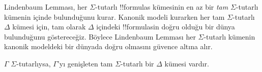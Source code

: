 \documentclass[../../../include/open-logic-section]{subfiles}
\begin{document}


Lindenbaum Lemması, her $\Sigma$-tutarlı !!{formula}s kümesinin en az bir
\emph{tam} $\Sigma$-tutarlı kümenin içinde bulunduğunu kurar. Kanonik modeli
kurarken her tam $\Sigma$-tutarlı $\Delta$ kümesi için, tam olarak
$\Delta$ içindeki !!{formula}s{}in doğru olduğu bir dünya bulunduğunu
göstereceğiz. Böylece Lindenbaum Lemması her $\Sigma$-tutarlı kümenin
kanonik modeldeki bir dünyada doğru olmasını güvence altına alır.

\begin{thm}
  $\Gamma$ $\Sigma$-tutarlıysa, $\Gamma$'yı genişleten tam
  $\Sigma$-tutarlı bir $\Delta$ kümesi vardır.
\end{thm}
\end{document}
